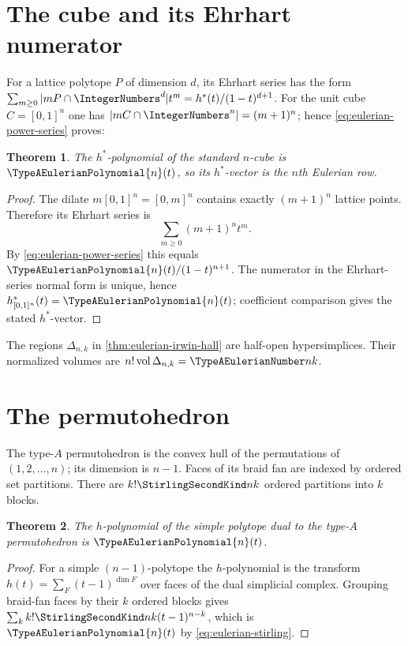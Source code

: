 \documentclass[11pt,a4paper,oneside,openany]{book}
\newtheorem{theorem}{Theorem}[chapter]
\theoremstyle{definition}
\theoremstyle{remark}
\begin{document}
\section{The cube and its Ehrhart numerator}
For a lattice polytope $P$ of dimension $d$, its Ehrhart series has the form
$\sum_{m\ge0}|mP\cap\IntegerNumbers^d|t^m=h^*(t)/(1-t)^{d+1}$.
For the unit cube $C=[0,1]^n$ one has $|mC\cap\IntegerNumbers^n|=(m+1)^n$; hence
\eqref{eq:eulerian-power-series} proves:
\begin{theorem}
The $h^*$-polynomial of the standard $n$-cube is $\TypeAEulerianPolynomial{n}(t)$, so its $h^*$-vector is
the $n$th Eulerian row.
\end{theorem}
\begin{proof}
The dilate $m[0,1]^n=[0,m]^n$ contains exactly $(m+1)^n$ lattice points.
Therefore its Ehrhart series is
\[
 \sum_{m\ge0}(m+1)^nt^m.
\]
By \eqref{eq:eulerian-power-series} this equals
$\TypeAEulerianPolynomial{n}(t)/(1-t)^{n+1}$.  The numerator in the Ehrhart-series normal form is
unique, hence $h^*_{[0,1]^n}(t)=\TypeAEulerianPolynomial{n}(t)$; coefficient comparison gives the
stated $h^*$-vector.
\end{proof}

The regions $\Delta_{n,k}$ in \cref{thm:eulerian-irwin-hall} are half-open
hypersimplices.  Their normalized volumes are $n!\operatorname{vol}\Delta_{n,k}
=\TypeAEulerianNumber nk$.

\section{The permutohedron}
The type-$A$ permutohedron is the convex hull of the permutations of
$(1,2,\ldots,n)$; its dimension is $n-1$.  Faces of its braid fan are indexed by
ordered set partitions.  There are $k!\StirlingSecondKind nk$ ordered partitions into $k$
blocks.

\begin{theorem}
The $h$-polynomial of the simple polytope dual to the type-$A$ permutohedron is
$\TypeAEulerianPolynomial{n}(t)$.
\end{theorem}
\begin{proof}
For a simple $(n-1)$-polytope the $h$-polynomial is the transform
$h(t)=\sum_F(t-1)^{\dim F}$ over faces of the dual simplicial complex.  Grouping
braid-fan faces by their $k$ ordered blocks gives
$\sum_k k!\StirlingSecondKind nk(t-1)^{n-k}$, which is $\TypeAEulerianPolynomial{n}(t)$ by
\eqref{eq:eulerian-stirling}.
\end{proof}
\end{document}
